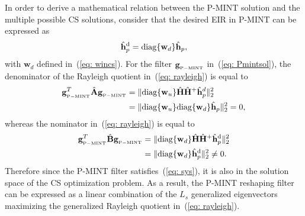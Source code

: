 \documentclass[10pt]{IEEEtran}
\DeclareMathOperator{\diag}{diag}
\begin{document}
In order to derive a mathematical relation between the P-MINT solution and the multiple possible CS solutions, consider that the desired EIR in P-MINT can be expressed as
\begin{equation}
\hat{\mathbf{h}}_p^{\rm d} = {\diag}\{\mathbf{w}_d \}\hat{\mathbf{h}}_p,
\end{equation}
with $\mathbf{w}_d$ defined in~(\ref{eq: wincs}).
For the filter $\mathbf{g}_{{}_{\rm P-MINT}}$ in~(\ref{eq: Pmintsol}), the denominator of the Rayleigh quotient in~(\ref{eq: rayleigh}) is equal to
\begin{align}
\mathbf{g}_{{}_{\rm P-MINT}}^T \hat{\mathbf{A}} \mathbf{g}_{{}_{\rm P-MINT}} &= \|{\diag}\{\mathbf{w}_{u}\}\hat{\mathbf{H}} \hat{\mathbf{H}}^+\hat{\mathbf{h}}_p^d \|_2^2 \\
& =  \|{\diag}\{\mathbf{w}_{u}\} {\diag} \{\mathbf{w}_d \} \hat{\mathbf{h}}_p\|_2^2 = 0,
\end{align}
whereas the nominator in~(\ref{eq: rayleigh}) is equal to
\begin{align}
\mathbf{g}_{{}_{\rm P-MINT}}^T \hat{\mathbf{B}} \mathbf{g}_{{}_{\rm P-MINT}} & = \|{\diag}\{\mathbf{w}_{d}\}\hat{\mathbf{H}} \hat{\mathbf{H}}^+\hat{\mathbf{h}}_p^{\rm d} \|_2^2 \\
& =  \|{\diag}\{\mathbf{w}_{d}\} \hat{\mathbf{h}}_p^{\rm d} \|_2^2 \neq 0.
\end{align}
Therefore since the P-MINT filter satisfies~(\ref{eq: sys}), it is also in the solution space of the CS optimization problem.
As a result, the P-MINT reshaping filter can be expressed as a linear combination of the $L_s$ generalized eigenvectors maximizing the generalized Rayleigh quotient in~(\ref{eq: rayleigh}).
\end{document}
